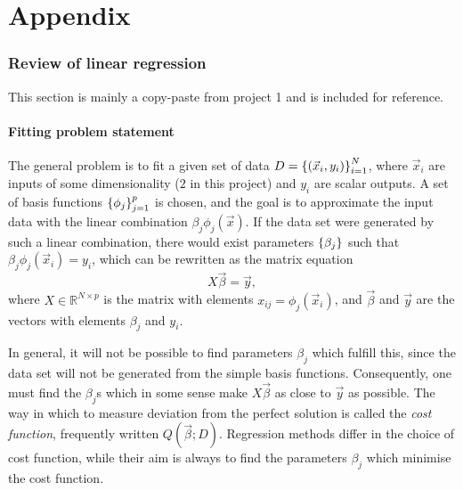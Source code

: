 \documentclass[11pt,british,a4paper]{article}
\numberwithin{equation}{section}
\begin{document}
\clearpage
\appendix
\part*{Appendix}
\renewcommand{\thesection}{\Alph{section}}

\section{Review of linear regression}\label{sec:linreg}
This section is mainly a copy-paste from project 1 and is included for reference.
\subsection{Fitting problem statement}
The general problem is to fit a given set of data \(D=\qty{(\vec{x}_i,y_i)}_{i=1}^N\), where \(\vec{x}_i\) are inputs of some dimensionality (\(2\) in this project) and \(y_i\) are scalar outputs.
A set of basis functions \(\qty{\phi_j}_{j=1}^p\) is chosen, and the goal is to approximate the input data with the linear combination \(\beta_j \phi_j(\vec{x})\).
If the data set were generated by such a linear combination, there would exist parameters \(\qty{\beta_j}\) such that \(\beta_j\phi_j(\vec{x}_i)=y_i\), which can be rewritten as the matrix equation
\begin{equation}
    X\vec{\beta} = \vec{y},
\end{equation}
where \(X\in\mathbb{R}^{N\times p}\) is the matrix with elements \(x_{ij}=\phi_j(\vec{x}_i)\), and \(\vec{\beta}\) and \(\vec{y}\) are the vectors with elements \(\beta_j\) and \(y_i\).

In general, it will not be possible to find parameters \(\beta_j\) which fulfill this, since the data set will not be generated from the simple basis functions.
Consequently, one must find the \(\beta_j\)s which in some sense make \(X\vec{\beta}\) as close to \(\vec{y}\) as possible.
The way in which to measure deviation from the perfect solution is called the \emph{cost function}, frequently written \(Q(\vec{\beta};D)\).
Regression methods differ in the choice of cost function, while their aim is always to find the parameters \(\beta_j\) which minimise the cost function.
\end{document}
